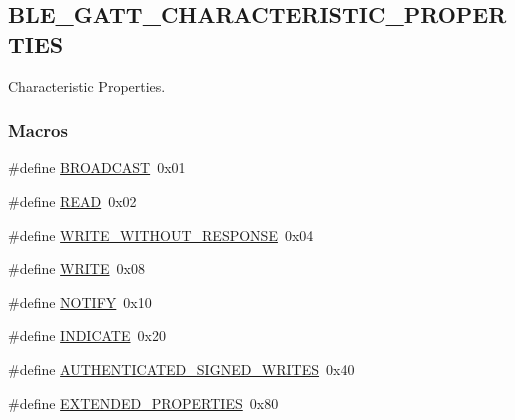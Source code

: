 \hypertarget{group___b_l_e___g_a_t_t___c_h_a_r_a_c_t_e_r_i_s_t_i_c___p_r_o_p_e_r_t_i_e_s}{}\subsection{B\+L\+E\+\_\+\+G\+A\+T\+T\+\_\+\+C\+H\+A\+R\+A\+C\+T\+E\+R\+I\+S\+T\+I\+C\+\_\+\+P\+R\+O\+P\+E\+R\+T\+I\+ES}
\label{group___b_l_e___g_a_t_t___c_h_a_r_a_c_t_e_r_i_s_t_i_c___p_r_o_p_e_r_t_i_e_s}


Characteristic Properties.  


\subsubsection*{Macros}
\begin{DoxyCompactItemize}
\item 
\#define \hyperlink{group___b_l_e___g_a_t_t___c_h_a_r_a_c_t_e_r_i_s_t_i_c___p_r_o_p_e_r_t_i_e_s_gac286e1243ab6be2c950c277e5e1377f9}{B\+R\+O\+A\+D\+C\+A\+ST}~0x01
\item 
\#define \hyperlink{group___b_l_e___g_a_t_t___c_h_a_r_a_c_t_e_r_i_s_t_i_c___p_r_o_p_e_r_t_i_e_s_gada74e7db007a68e763f20c17f2985356}{R\+E\+AD}~0x02
\item 
\#define \hyperlink{group___b_l_e___g_a_t_t___c_h_a_r_a_c_t_e_r_i_s_t_i_c___p_r_o_p_e_r_t_i_e_s_ga236285dbfe417c5b7b67f6ab244ab864}{W\+R\+I\+T\+E\+\_\+\+W\+I\+T\+H\+O\+U\+T\+\_\+\+R\+E\+S\+P\+O\+N\+SE}~0x04
\item 
\#define \hyperlink{group___b_l_e___g_a_t_t___c_h_a_r_a_c_t_e_r_i_s_t_i_c___p_r_o_p_e_r_t_i_e_s_gaa10f470e996d0f51210d24f442d25e1e}{W\+R\+I\+TE}~0x08
\item 
\#define \hyperlink{group___b_l_e___g_a_t_t___c_h_a_r_a_c_t_e_r_i_s_t_i_c___p_r_o_p_e_r_t_i_e_s_gac0efcd21eceb2f2ec7421c64b5c81b33}{N\+O\+T\+I\+FY}~0x10
\item 
\#define \hyperlink{group___b_l_e___g_a_t_t___c_h_a_r_a_c_t_e_r_i_s_t_i_c___p_r_o_p_e_r_t_i_e_s_ga2f5bc89d94c54ea1e875408418c5608d}{I\+N\+D\+I\+C\+A\+TE}~0x20
\item 
\#define \hyperlink{group___b_l_e___g_a_t_t___c_h_a_r_a_c_t_e_r_i_s_t_i_c___p_r_o_p_e_r_t_i_e_s_gabf4ca25e87749535a13df067fb420d2a}{A\+U\+T\+H\+E\+N\+T\+I\+C\+A\+T\+E\+D\+\_\+\+S\+I\+G\+N\+E\+D\+\_\+\+W\+R\+I\+T\+ES}~0x40
\item 
\#define \hyperlink{group___b_l_e___g_a_t_t___c_h_a_r_a_c_t_e_r_i_s_t_i_c___p_r_o_p_e_r_t_i_e_s_ga1b38271d7f884afd55cc1740035e285c}{E\+X\+T\+E\+N\+D\+E\+D\+\_\+\+P\+R\+O\+P\+E\+R\+T\+I\+ES}~0x80
\end{DoxyCompactItemize}


